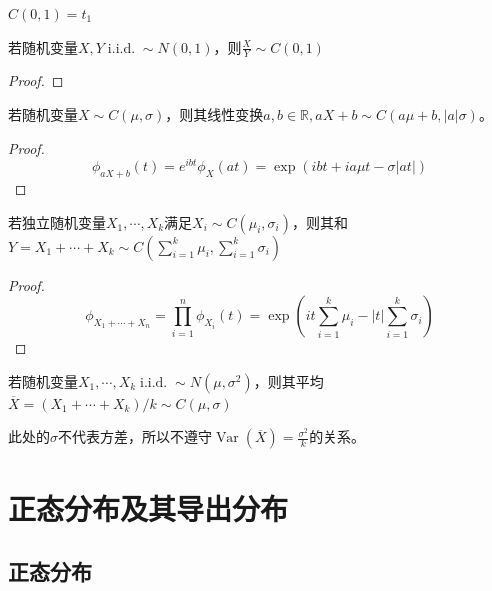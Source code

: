 \begin{proposition}
    $C(0,1)=t_1$
\end{proposition}

\begin{proposition}
    若随机变量$X,Y \operatorname{i.i.d.} \sim N(0,1)$，则$\frac{X}{Y} \sim C(0,1)$
\end{proposition}

\begin{proof}
\end{proof}

\begin{proposition}
    若随机变量$X \sim C(\mu, \sigma)$，则其线性变换$a,b \in \mathbb{R},aX + b \sim C(a \mu + b,|a| \sigma)$。
\end{proposition}

\begin{proof}
    \[ \phi_{aX + b}(t)=e^{ibt}\phi_X(a t)=\exp (ibt + ia\mu t-\sigma|a t|) \]
\end{proof}

\begin{proposition}
    若独立随机变量$X_1,\cdots ,X_k$满足$ X_i \sim C(\mu_i,\sigma_i)$，则其和$Y=X_1+\cdots +X_k \sim C(\sum_{i=1}^k\mu_i,\sum_{i=1}^k\sigma_i)$
\end{proposition}

\begin{proof}
    \[ \phi_{X_1+\cdots+ X_n} = \prod_{i=1}^n \phi_{X_i}(t)=\exp (it\sum_{i=1}^k\mu_i - |t|\sum_{i=1}^k \sigma_i) \]
\end{proof}

\begin{corollary}
    若随机变量$X_1,\cdots ,X_k \operatorname{i.i.d.} \sim N(\mu,\sigma^2)$，则其平均$\overline{X}=(X_1+\cdots +X_k)/k \sim C(\mu,\sigma)$
\end{corollary}

\begin{remark}
    此处的$\sigma$不代表方差，所以不遵守$\operatorname{Var}(\overline{X})=\frac{\sigma^2}{k}$的关系。
\end{remark}

\section{正态分布及其导出分布}

\subsection{正态分布}

